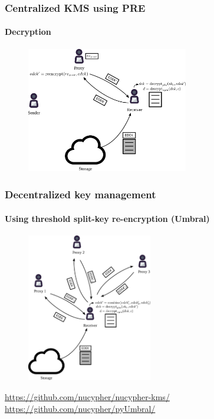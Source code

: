 \documentclass[xetex,mathsans,sans,aspectratio=169]{beamer}
\begin{document}
    \begin{frame}
        \frametitle{Centralized KMS using PRE}
        \framesubtitle{Decryption}
        \begin{figure}
            \centering
            \includegraphics[height=5.5cm]{pdf/decrypt.pdf}
        \end{figure}
    \end{frame}

    \begin{frame}
        \frametitle{Decentralized key management}
        \framesubtitle{Using threshold split-key re-encryption (Umbral)}
        \begin{figure}
            \centering
            \includegraphics[height=6.5cm]{pdf/decrypt-umbral.pdf}
        \end{figure}
        \url{https://github.com/nucypher/nucypher-kms/}
        \url{https://github.com/nucypher/pyUmbral/}
    \end{frame}
\end{document}
